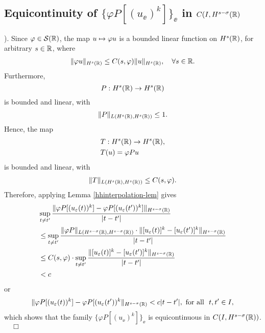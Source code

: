		\subsection{  Equicontinuity of $\{ \varphi P [(u_\ee)^k]\}_\ee$  in $C(I,
		H^{s-\sigma}(\mathbb{R})$}).
		Since $\varphi \in \mathcal{S}(\mathbb{R})$, the map $u \mapsto \varphi u$
		is a bounded linear function on $H^s(\mathbb{R})$, for arbitrary $s \in
		\mathbb{R}$, where  
		\begin{equation}
			\begin{split}
				\|\varphi u\|_{H^s(\mathbb{R})} \le C(s, \varphi)
				\|u\|_{H^s(\mathbb{R})}, \quad \forall s\in \mathbb{R}.
				\label{hhschwartz-estimate}
			\end{split}
		\end{equation}
		Furthermore, $$P: H^s(\mathbb{R}) \to H^s(\mathbb{R})$$ is bounded and linear,
		with 
		\begin{equation}
			\label{operator-normaa}
			\|P\|_{L(H^s(\mathbb{R}), H^s(\mathbb{R}))} \le 1.
		\end{equation}
		Hence, the map 
		\begin{equation}
			\label{the-map}
			\begin{split}
			& T: H^s(\mathbb{R}) \to H^s(\mathbb{R}),
			\\
			& T(u) = \varphi P u 
		\end{split}
	\end{equation}
	is bounded and linear, with 
	\begin{equation}
		\begin{split}
			\|T\|_{L(H^s(\mathbb{R}), H^s(\mathbb{R}))} \le C(s, \varphi).
			\label{op-norm-product}
		\end{split}
	\end{equation}
	Therefore, applying Lemma
		\ref{hhinterpolation-lem} gives 
		\begin{equation*}
			\begin{split}
			\label{hhequic-1}
			& \sup_{t \neq t'} \frac {\| \varphi P [(u_\varepsilon(t))^k] - \varphi
			P [(u_\varepsilon(t'))^k] \|_{H^{s -
			\sigma  }(\mathbb{R})}}{|t - t'|}
			\\
			& \le \sup_{t \neq t'}  \frac { \|\varphi P \|_{L(H^{s-\sigma}(\mathbb{R}),
			H^{s-\sigma}(\mathbb{R}))} \cdot \|   [u_\varepsilon(t)]^k  - 
			[u_\varepsilon(t')]^k \|_{H^{s -
			\sigma }(\mathbb{R})}}{|t - t'|}
			\\
			& \le C(s, \varphi) \cdot \sup_{t \neq t'}  \frac { \|   [u_\varepsilon(t)]^k  - 
			[u_\varepsilon(t')]^k \|_{H^{s -
			\sigma }(\mathbb{R})}}{|t - t'|}
			\\
			&< c
		\end{split}
		\end{equation*}
		or
		\begin{equation*}
			\label{hhequic-2}
			\|\varphi P [(u_\varepsilon(t))^k] - \varphi
			P [(u_\varepsilon(t'))^k \|_{H^{s - \sigma }(\mathbb{R})}< c|t -
			t'|, 
			\text{ for all }  \,\,  t, t'\in I,
		\end{equation*}
		which shows that  the family  $\{\varphi P [(u_\ee)^k]\}_\ee$ is
		equicontinuous in $C(I, H^{s-\sigma }(\mathbb{R}))$.  $\quad \Box$
